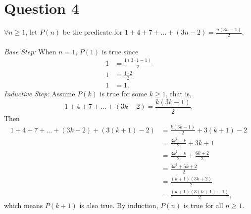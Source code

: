 \documentclass[12pt]{article}
\begin{document}
\section*{Question 4}
$\forall n \ge 1$, let $P(n)$ be the predicate for $1 + 4 + 7 + \dots + (3n - 2) = \frac{n (3n - 1)}{2}$. \\ \\
\textit{Base Step:} When $n = 1$, $P(1)$ is true since
\begin{align*}
    1 &= \frac{1 (3 \cdot 1 - 1)}{2} \\
    1 &= \frac{1 \cdot 2}{2} \\
    1 &= 1.
\end{align*}
\textit{Inductive Step:} Assume $P(k)$ is true for some $k \ge 1$, that is,
\[
    1 + 4 + 7 + \dots + (3k - 2) = \frac{k (3k - 1)}{2}.
\]
Then
\begin{align*}
    1 + 4 + 7 + \dots + (3k - 2) + (3(k + 1) - 2) &= \frac{k (3k - 1)}{2} + 3(k + 1) - 2 \\
    &= \frac{3k^2 - k}{2} + 3k + 1 \\
    &= \frac{3k^2 - k}{2} + \frac{6k + 2}{2} \\
    &= \frac{3k^2 + 5k + 2}{2} \\
    &= \frac{(k + 1)(3k + 2)}{2} \\
    &= \frac{(k + 1)(3(k + 1) - 1)}{2},
\end{align*}
which means $P(k + 1)$ is also true. By induction, $P(n)$ is true for all $n \ge 1$.
\end{document}
